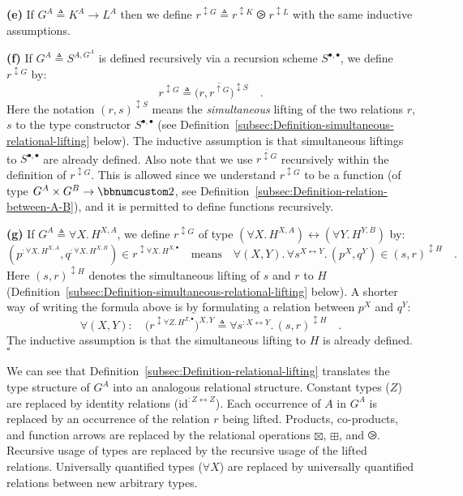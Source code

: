 \textbf{(e)} If $G^{A}\triangleq K^{A}\rightarrow L^{A}$ then we
define $r^{\updownarrow G}\triangleq r^{\updownarrow K}\ogreaterthan r^{\updownarrow L}$
with the same inductive assumptions.

\textbf{(f)} If $G^{A}\triangleq S^{A,G^{A}}$ is defined recursively
via a recursion scheme $S^{\bullet,\bullet}$, we define $r^{\updownarrow G}$
by:
\[
r^{\updownarrow G}\triangleq\big(r,\overline{r^{\uparrow G}}\big)^{\updownarrow S}\quad.
\]
Here the notation $(r,s)^{\updownarrow S}$ means the \emph{simultaneous}
lifting of the two relations $r$, $s$ to the type constructor $S^{\bullet,\bullet}$
(see Definition~\ref{subsec:Definition-simultaneous-relational-lifting}
below). The inductive assumption is that simultaneous liftings to
$S^{\bullet,\bullet}$ are already defined. Also note that we use
$\overline{r^{\updownarrow G}}$ recursively within the definition
of $r^{\updownarrow G}$. This is allowed since we understand $r^{\updownarrow G}$
to be a function (of type $G^{A}\times G^{B}\rightarrow\bbnum 2$,
see Definition~\ref{subsec:Definition-relation-between-A-B}), and
it is permitted to define functions recursively. 

\textbf{(g)} If $G^{A}\triangleq\forall X.\,H^{X,A}$, we define $r^{\updownarrow G}$
of type $(\forall X.\,H^{X,A})\leftrightarrow(\forall Y.\,H^{Y,B})$
by:
\[
(p^{:\forall X.\,H^{X,A}},q^{:\forall X.\,H^{X,B}})\in r^{\updownarrow\forall X.\,H^{X,\bullet}}\quad\text{means}\quad\forall(X,Y).\,\forall s^{X\leftrightarrow Y}.\,(p^{X},q^{Y})\in(s,r)^{\updownarrow H}\quad.
\]
Here $(s,r)^{\updownarrow H}$ denotes the simultaneous lifting of
$s$ and $r$ to $H$ (Definition~\ref{subsec:Definition-simultaneous-relational-lifting}
below). A shorter way of writing the formula above is by formulating
a relation between $p^{X}$ and $q^{Y}$:
\begin{equation}
\forall(X,Y):\quad\big(r^{\updownarrow\forall Z.\,H^{Z,\bullet}}\big)^{X,Y}\triangleq\forall s^{:X\leftrightarrow Y}.\,(s,r)^{\updownarrow H}\quad.\label{eq:relational-lifting-quantified-types-short}
\end{equation}
The inductive assumption is that the simultaneous lifting to $H$
is already defined. $\square$

We can see that Definition~\ref{subsec:Definition-relational-lifting}
translates the type structure of $G^{A}$ into an analogous relational
structure. Constant types ($Z$) are replaced by identity relations
($\text{id}^{:Z\leftrightarrow Z}$). Each occurrence of $A$ in $G^{A}$
is replaced by an occurrence of the relation $r$ being lifted. Products,
co-products, and function arrows are replaced by the relational operations
$\boxtimes$, $\boxplus$, and $\ogreaterthan$. Recursive usage of
types are replaced by the recursive usage of the lifted relations.
Universally quantified types ($\forall X$) are replaced by universally
quantified relations between new arbitrary types. 


